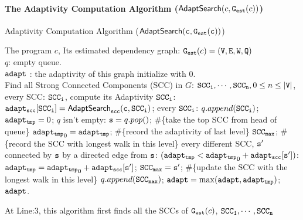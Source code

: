 \paragraph*{The Adaptivity Computation Algorithm ($\mathsf{AdaptSearch}(c, \mathtt{{G_{est}}}(c))$)}
\begin{algorithm}
    \caption{
    {Adaptivity Computation Algorithm ({$\mathtt{\mathsf{AdaptSearch}(c, \mathtt{{G_{est}}}(c))}$})}
    \label{alg:adapt}
    }
    \begin{algorithmic}[1]
    \REQUIRE The program $c$, 
    Its estimated dependency graph: $\mathtt{{G_{est}}}(c) = (\mathtt{V}, \mathtt{E}, \mathtt{W}, \mathtt{Q})$
    \\
    $q$: empty queue.
    \\
    $\mathtt{adapt}$ : the adaptivity of this graph initialize with $0$.
    \\
    \STATE Find all Strong Connected Components (SCC) in $G$: $\mathtt{SCC_1}, \cdots, \mathtt{SCC_n}, 0 \leq n \leq |\mathtt{V}|$, 
     every SCC: $\mathtt{SCC_i}$, compute its Adaptivity $\mathtt{SCC_i}$:
    \STATE \quad $\mathtt{adapt_{scc}[SCC_i] = \mathsf{AdaptSearch}_{scc}(c, SCC_i)}$;
     every $\mathtt{SCC_i}$:
    \STATE \qquad $q.append(\mathtt{SCC_i})$;
    \STATE \qquad $\mathtt{adapt_{tmp}} = 0$;
    \STATE {} $q$ isn't empty:
    \STATE \qquad \qquad $\mathtt{s} = q.pop()$;  \#\{take the top SCC from head of queue\}
    \STATE \qquad \qquad  $\mathtt{adapt_{tmp}}_0= \mathtt{adapt_{tmp}}$; \#\{record the adaptivity of last level\}
    \STATE \qquad \qquad  $\mathtt{SCC_{max}}$;  \#\{record the SCC with longest walk in this level\}
    \STATE \qquad {} every 
    different SCC, $\mathtt{s'}$ connected by $\mathtt{s}$ by a directed edge from $\mathtt{s}$:
    \STATE \qquad \qquad {} $(\mathtt{adapt_{tmp}} < \mathtt{adapt_{tmp}}_0 + \mathtt{adapt_{scc}[s']})$:
    \STATE \qquad \qquad \qquad \qquad $\mathtt{adapt_{tmp}} = \mathtt{adapt_{tmp}}_0 + \mathtt{adapt_{scc}[s']}$; 
    \STATE \qquad \qquad \qquad \qquad $\mathtt{SCC_{max} = s'} $; \#\{update the SCC with the longest walk in this level\} 
    \STATE \qquad \qquad \qquad $q.append(\mathtt{SCC_{max}})$;
    \STATE \qquad $\mathtt{adapt} = \max(\mathtt{adapt}, \mathtt{adapt_{tmp}})$;    
    \RETURN $\mathtt{adapt}$.
    \end{algorithmic}
    \end{algorithm}
    At Line:3, this algorithm first finds all the SCCs of $\mathtt{{G_{est}}}(c)$, $\mathtt{SCC_1}, \cdots, \mathtt{SCC_n}$
